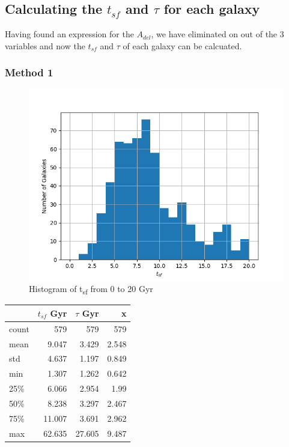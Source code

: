 \documentclass[a4paper,twocolumn]{article}
\begin{document}
\pagebreak

\subsection{Calculating the \(t_{sf}\) and \(\tau\) for each galaxy}
\label{sec:org1230772}

Having found an expression for the \(A_{del}\), we have eliminated on out of the 3 variables and now the \(t_{sf}\) and \(\tau\) of each galaxy can be calcuated.



\subsubsection{Method 1}
\label{sec:org9e16912}
\begin{figure}[!htpb]
\centering
\includegraphics[width=.9\linewidth]{./figs/tsf-hist.png}
\caption{\label{fig:Histogram of t_{sf} from 0 to 20 Gyr}Histogram of t\textsubscript{sf} from 0 to 20 Gyr}
\end{figure}


\begin{center}
\begin{tabular}{lrrr}
 & \(t_{sf}\) Gyr & \(\tau\) Gyr & x\\[0pt]
\hline
count & 579 & 579 & 579\\[0pt]
mean & 9.047 & 3.429 & 2.548\\[0pt]
std & 4.637 & 1.197 & 0.849\\[0pt]
min & 1.307 & 1.262 & 0.642\\[0pt]
25\% & 6.066 & 2.954 & 1.99\\[0pt]
50\% & 8.238 & 3.297 & 2.467\\[0pt]
75\% & 11.007 & 3.691 & 2.962\\[0pt]
max & 62.635 & 27.605 & 9.487\\[0pt]
\end{tabular}
\end{center}
\end{document}
